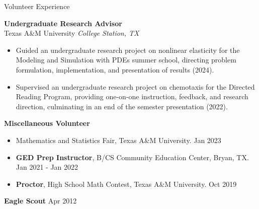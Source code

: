 \documentclass{resume} %
\begin{document}
\begin{rSection}{Volunteer Experience} 

\textbf{Undergraduate Research Advisor} \\ 
Texas A\&M University \hfill \textit{College Station, TX}
\begin{itemize}
    \item Guided an undergraduate research project on nonlinear elasticity for the Modeling and Simulation with PDEs summer school, directing problem formulation, implementation, and presentation of results (2024).
    \item Supervised an undergraduate research project on chemotaxis for the Directed Reading Program, providing one-on-one instruction, feedback, and research direction, culminating in an end of the semester presentation (2022).
\end{itemize}

\textbf{Miscellaneous Volunteer}
\begin{itemize}
    \item Mathematics and Statistics Fair, Texas A\&M University. \hfill Jan 2023
    \item \textbf{GED Prep Instructor}, B/CS Community Education Center, Bryan, TX. %
    \hfill Jan 2021 - Jan 2022
    \item \textbf{Proctor}, High School Math Contest, Texas A\&M University. %
    \hfill Oct 2019
\end{itemize}

\textbf{Eagle Scout} \hfill Apr 2012

\end{rSection}

\end{document}
